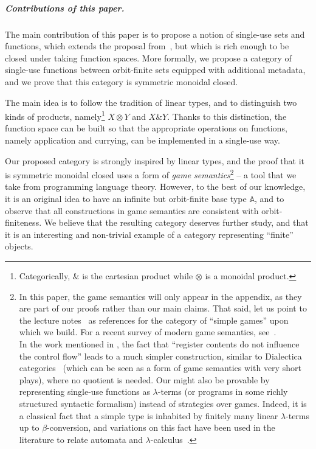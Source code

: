 \documentclass[10pt,a4paper]{amsart}
\numberwithin{equation}{section}
\theoremstyle{plain}
\newcommand{\atoms}{\mathbb A}
\begin{document}
 \subparagraph{Contributions of this paper.}
 The main contribution of this paper is to propose a notion of single-use sets and functions, which extends the proposal from~\cite{stefanski-phd}, but which is rich enough to be closed under taking function spaces. More formally, we propose a category of single-use functions between orbit-finite sets equipped with additional metadata, and we prove that this category is symmetric monoidal closed.

The main idea is to follow the tradition of linear types, and to  distinguish two kinds of products, namely\footnote{Categorically, $\&$ is the cartesian product while $\otimes$ is a monoidal product.} $X \otimes Y$ and $X \& Y$. Thanks to this distinction, the function space can be built so that the appropriate operations on functions, namely application and currying, can be implemented in a single-use way.

Our proposed category is strongly inspired by linear types, and the proof that it is symmetric monoidal closed uses a form of \emph{game semantics}\footnote{In this paper, the game semantics will only appear in the appendix, as they are part of our proofs rather than our main claims. That said, let us point to the lecture notes~\cite{abramsky2013semantics,Hyland1997} as references for the category of ``simple games'' upon which we build. For a recent survey of modern game semantics, see~\cite{ClairambaultHDR}.\\
  In the work mentioned in , the fact that ``register contents do not influence the control flow'' leads to a much simpler construction, similar to Dialectica categories~\cite{PaivaDialectica} (which can be seen as a form of game semantics with very short plays), where no quotient is needed. Our  might also be provable by representing single-use functions as $\lambda$-terms (or programs in some richly structured syntactic formalism) instead of strategies over games. Indeed, it is a classical fact that a simple type is inhabited by finitely many linear $\lambda$-terms up to $\beta$-conversion, and variations on this fact have been used in the literature to relate automata and $\lambda$-calculus~\cite{IATLC,LambdaTransducer}.} -- a tool that we take from programming language theory. However, to the best of our knowledge, it is an original idea to have an infinite but orbit-finite base type $\atoms$, and to observe that all constructions in game semantics are consistent with orbit-finiteness. We believe that the resulting category deserves further study, and that it is an interesting and non-trivial example of a category representing ``finite'' objects.
\end{document}

